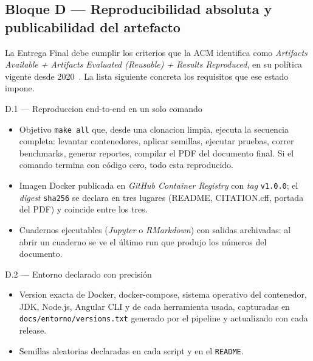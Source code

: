 \documentclass[11pt,a4paper]{article}
\begin{document}
\subsection{Bloque D --- Reproducibilidad absoluta y publicabilidad del artefacto}

La Entrega Final debe cumplir los criterios que la ACM identifica como \emph{Artifacts Available + Artifacts Evaluated (Reusable) + Results Reproduced}, en su pol\'{i}tica vigente desde 2020~\cite{acm2020artifact}. La lista siguiente concreta los requisitos que ese estado impone.

\begin{cajarepo}{D.1 --- Reproduccion end-to-end en un solo comando}
    \begin{itemize}
        \item Objetivo \texttt{make all} que, desde una clonacion limpia, ejecuta la secuencia completa: levantar contenedores, aplicar semillas, ejecutar pruebas, correr benchmarks, generar reportes, compilar el PDF del documento final. Si el comando termina con c\'{o}digo cero, todo esta reproducido.
        \item Imagen Docker publicada en \emph{GitHub Container Registry} con \emph{tag} \texttt{v1.0.0}; el \emph{digest} \texttt{sha256} se declara en tres lugares (README, CITATION.cff, portada del PDF) y coincide entre los tres.
        \item Cuadernos ejecutables (\emph{Jupyter} o \emph{RMarkdown}) con salidas archivadas: al abrir un cuaderno se ve el \'{u}ltimo run que produjo los n\'{u}meros del documento.
    \end{itemize}
\end{cajarepo}

\begin{cajarepo}{D.2 --- Entorno declarado con precisi\'{o}n}
    \begin{itemize}
        \item Version exacta de Docker, docker-compose, sistema operativo del contenedor, JDK, Node.js, Angular CLI y de cada herramienta usada, capturadas en \texttt{docs/entorno/versions.txt} generado por el pipeline y actualizado con cada release.
        \item Semillas aleatorias declaradas en cada script y en el \texttt{README}.
    \end{itemize}
\end{cajarepo}
\end{document}
